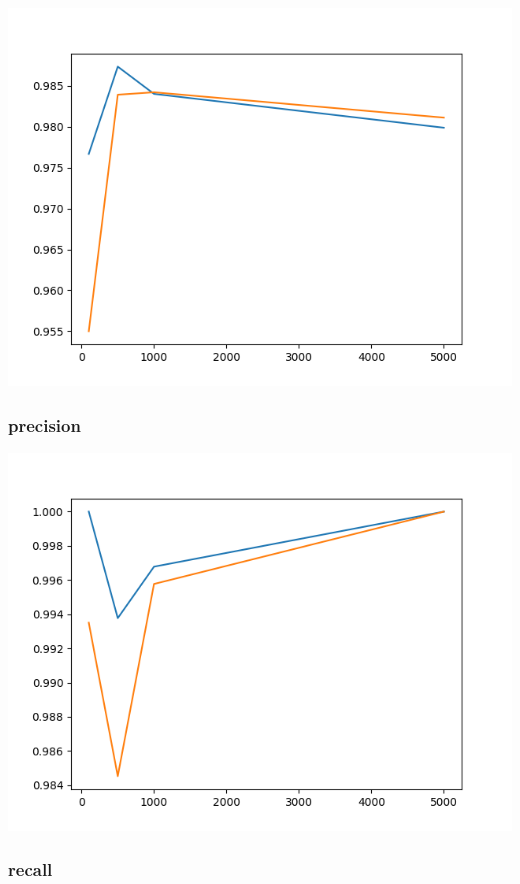 \documentclass[11pt]{article}
\begin{document}
\begin{center}
\includegraphics[scale=0.7]{./res/b_accuracy.png}
\end{center}

\subsubsection*{precision}
\label{sec:orgcb88ff2}

\begin{center}
\includegraphics[scale=0.7]{./res/b_precision.png}
\end{center}

\subsubsection*{recall}
\label{sec:org1dde518}
\end{document}
